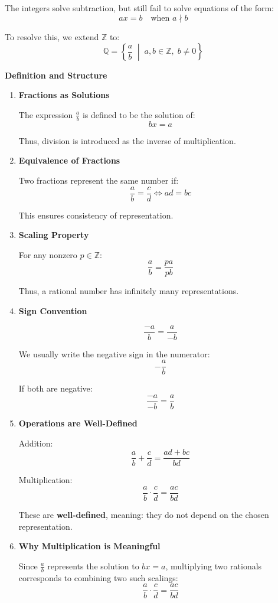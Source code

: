 \documentclass[11pt]{article}
\newcommand{\Z}{\mathbb{Z}}
\newcommand{\Q}{\mathbb{Q}}
\begin{document}
\begin{theorybox}

The integers solve subtraction, but still fail to solve equations of the form:
\[
ax = b \quad \text{when } a \nmid b
\]

To resolve this, we extend $\Z$ to:
\[
\Q = \left\{ \frac{a}{b} \;\middle|\; a,b \in \Z,\; b \neq 0 \right\}
\]

\textbf{Definition and Structure}

\begin{enumerate}

\item \textbf{Fractions as Solutions}

The expression $\frac{a}{b}$ is defined to be the solution of:
\[
bx = a
\]

Thus, division is introduced as the inverse of multiplication.

\item \textbf{Equivalence of Fractions}

Two fractions represent the same number if:
\[
\frac{a}{b} = \frac{c}{d} \iff ad = bc
\]

This ensures consistency of representation.

\item \textbf{Scaling Property}

For any nonzero $p \in \Z$:
\[
\frac{a}{b} = \frac{pa}{pb}
\]

Thus, a rational number has infinitely many representations.

\item \textbf{Sign Convention}

\[
\frac{-a}{b} = \frac{a}{-b}
\]

We usually write the negative sign in the numerator:
\[
-\frac{a}{b}
\]

If both are negative:
\[
\frac{-a}{-b} = \frac{a}{b}
\]

\item \textbf{Operations are Well-Defined}

Addition:
\[
\frac{a}{b} + \frac{c}{d} = \frac{ad + bc}{bd}
\]

Multiplication:
\[
\frac{a}{b} \cdot \frac{c}{d} = \frac{ac}{bd}
\]

These are \textbf{well-defined}, meaning:
they do not depend on the chosen representation.

\item \textbf{Why Multiplication is Meaningful}

Since $\frac{a}{b}$ represents the solution to $bx = a$, multiplying two rationals corresponds to combining two such scalings:
\[
\frac{a}{b} \cdot \frac{c}{d} = \frac{ac}{bd}
\]


\end{enumerate}
\end{theorybox}
\end{document}
